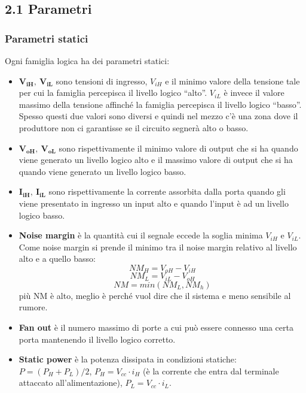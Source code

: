 \documentclass[
]{article}
\providecommand{\tightlist}{%
  \setlength{\itemsep}{0pt}\setlength{\parskip}{0pt}}
\begin{document}
\subsection{2.1 Parametri}\label{parametri}

\subsubsection{Parametri statici}\label{parametri-statici}

Ogni famiglia logica ha dei parametri statici:

\begin{itemize}
\tightlist
\item
  \(\mathbf{V_{iH}},\ \mathbf{V_{iL}}\) sono tensioni di ingresso,
  \(V_{iH}\) e il minimo valore della tensione tale per cui la famiglia
  percepisca il livello logico ``alto''. \(V_{iL}\) è invece il valore
  massimo della tensione affinché la famiglia percepisca il livello
  logico ``basso''. Spesso questi due valori sono diversi e quindi nel
  mezzo c'è una zona dove il produttore non ci garantisse se il circuito
  segnerà alto o basso.
\item
  \(\mathbf{V_{oH}},\ \mathbf{V_{oL}}\) sono rispettivamente il minimo
  valore di output che si ha quando viene generato un livello logico
  alto e il massimo valore di output che si ha quando viene generato un
  livello logico basso.
\item
  \(\mathbf{I_{iH}},\ \mathbf{I_{iL}}\) sono rispettivamente la corrente
  assorbita dalla porta quando gli viene presentato in ingresso un input
  alto e quando l'input è ad un livello logico basso.\\
\item
  \textbf{Noise margin} è la quantità cui il segnale eccede la soglia
  minima \(V_{iH}\) e \(V_{iL}\). Come noise margin si prende il minimo
  tra il noise margin relativo al livello alto e a quello basso:
  \[NM_{H} =V_{oH}-V_{iH}\] \[NM_{L} =V_{iL}-V_{oH}\]
  \[NM =min(NM_{L},NM_{h})\] più NM è alto, meglio è perché vuol dire
  che il sistema e meno sensibile al rumore.\\
\item
  \textbf{Fan out} è il numero massimo di porte a cui può essere
  connesso una certa porta mantenendo il livello logico corretto.\\
\item
  \textbf{Static power} è la potenza dissipata in condizioni statiche:
  \(P=(P_{H}+P_{L})/2\), \(P_{H}=V_{cc}\cdot i_{H}\) (è la corrente che
  entra dal terminale attaccato all'alimentazione),
  \(P_{L}=V_{cc}\cdot i_{L}\).
\end{itemize}
\end{document}
